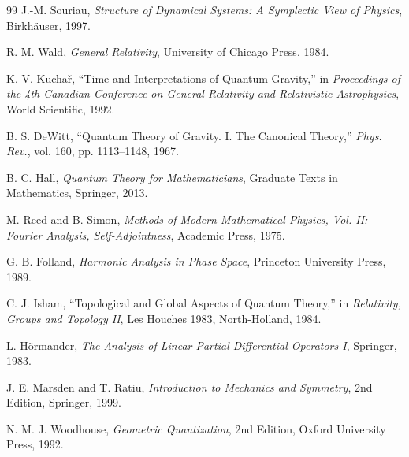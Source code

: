 \documentclass[12pt,oneside]{book}
\theoremstyle{plain}
\theoremstyle{definition}
\begin{document}
\begin{thebibliography}{99}
J.-M. Souriau, \emph{Structure of Dynamical Systems: A Symplectic View of Physics}, Birkhäuser, 1997.

R. M. Wald, \emph{General Relativity}, University of Chicago Press, 1984.

K. V. Kuchař, ``Time and Interpretations of Quantum Gravity,'' in \emph{Proceedings of the 4th Canadian Conference on General Relativity and Relativistic Astrophysics}, World Scientific, 1992.

B. S. DeWitt, ``Quantum Theory of Gravity. I. The Canonical Theory,'' \emph{Phys. Rev.}, vol. 160, pp. 1113–1148, 1967.

B. C. Hall, \emph{Quantum Theory for Mathematicians}, Graduate Texts in Mathematics, Springer, 2013.

M. Reed and B. Simon, \emph{Methods of Modern Mathematical Physics, Vol. II: Fourier Analysis, Self-Adjointness}, Academic Press, 1975.

G. B. Folland, \emph{Harmonic Analysis in Phase Space}, Princeton University Press, 1989.

C. J. Isham, ``Topological and Global Aspects of Quantum Theory,'' in \emph{Relativity, Groups and Topology II}, Les Houches 1983, North-Holland, 1984.

L. Hörmander, \emph{The Analysis of Linear Partial Differential Operators I}, Springer, 1983.

J. E. Marsden and T. Ratiu, \emph{Introduction to Mechanics and Symmetry}, 2nd Edition, Springer, 1999.

N. M. J. Woodhouse, \emph{Geometric Quantization}, 2nd Edition, Oxford University Press, 1992.

\end{thebibliography}
\end{document}
